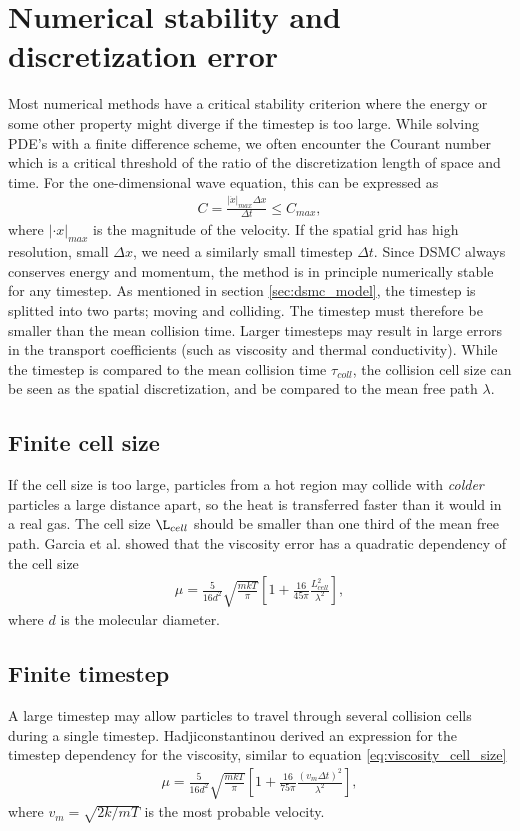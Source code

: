 \section{Numerical stability and discretization error}
\label{sec:dsmc_stability}
Most numerical methods have a critical stability criterion where the energy or some other property might diverge if the timestep is too large. While solving PDE's with a finite difference scheme, we often encounter the Courant number which is a critical threshold of the ratio of the discretization length of space and time. For the one-dimensional wave equation, this can be expressed as
\begin{align}
	C = \frac{|\dot x|_{max} \Delta x}{\Delta t} \leq C_{max},
\end{align}
where $|\cdot x|_{max}$ is the magnitude of the velocity. If the spatial grid has high resolution, small $\Delta x$, we need a similarly small timestep $\Delta t$. Since DSMC always conserves energy and momentum, the method is in principle numerically stable for any timestep. As mentioned in section \ref{sec:dsmc_model}, the timestep is splitted into two parts; moving and colliding. The timestep must therefore be smaller than the mean collision time. Larger timesteps may result in large errors in the transport coefficients (such as viscosity and thermal conductivity)\cite{karniadakis2005microflows}. While the timestep is compared to the mean collision time $\tau_{coll}$, the collision cell size can be seen as the spatial discretization, and be compared to the mean free path $\lambda$. 
\subsection{Finite cell size}
If the cell size is too large, particles from a hot region may collide with \textit{colder} particles a large distance apart, so the heat is transferred faster than it would in a real gas. The cell size $\L_{cell}$ should be smaller than one third of the mean free path\cite{karniadakis2005microflows}. Garcia et al. \cite{alexander1998cell} showed that the viscosity error has a quadratic dependency of the cell size
\begin{align}
	\label{eq:viscosity_cell_size}
	\mu = \frac{5}{16d^2}\sqrt{\frac{mk T}{\pi}} \left [1 + \frac{16}{45\pi}\frac{L_{cell}^2}{\lambda^2}\right],
\end{align}
where $d$ is the molecular diameter. 
\subsection{Finite timestep}
A large timestep may allow particles to travel through several collision cells during a single timestep. Hadjiconstantinou \cite{hadjiconstantinou2000analysis} derived an expression for the timestep dependency for the viscosity, similar to equation \eqref{eq:viscosity_cell_size}
\begin{align}
	\mu = \frac{5}{16d^2}\sqrt{\frac{mk T}{\pi}} \left [1 + \frac{16}{75\pi}\frac{(v_m\Delta t)^2}{\lambda^2}\right],
\end{align}
where $v_m=\sqrt{2k/mT}$ is the most probable velocity. 